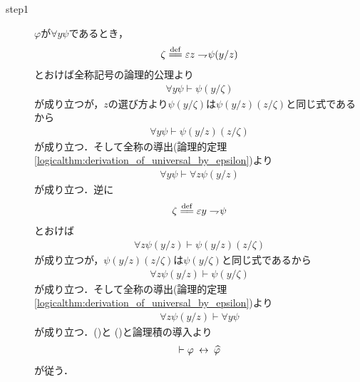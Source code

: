 	\begin{sketch}\mbox{}
		\begin{description}
			\item[step1]
				$\varphi$が$\forall y \psi$であるとき，
				\begin{align}
					\zeta \defeq \varepsilon z \negation \psi(y/z)
				\end{align}
				とおけば全称記号の論理的公理より
				\begin{align}
					\forall y \psi \vdash \psi(y/\zeta)
				\end{align}
				が成り立つが，$z$の選び方より$\psi(y/\zeta)$は$\psi(y/z)(z/\zeta)$と同じ式であるから
				\begin{align}
					\forall y \psi \vdash \psi(y/z)(z/\zeta)
				\end{align}
				が成り立つ．そして全称の導出(論理的定理\ref{logicalthm:derivation_of_universal_by_epsilon})より
				\begin{align}
					\forall y \psi \vdash \forall z \psi(y/z)
					\label{fom:equivalence_by_replacing_bound_variables_1}
				\end{align}
				が成り立つ．逆に
				\begin{align}
					\zeta \defeq \varepsilon y \negation \psi
				\end{align}
				とおけば
				\begin{align}
					\forall z \psi(y/z) \vdash \psi(y/z)(z/\zeta)
				\end{align}
				が成り立つが，$\psi(y/z)(z/\zeta)$は$\psi(y/\zeta)$と同じ式であるから
				\begin{align}
					\forall z \psi(y/z) \vdash \psi(y/\zeta)
				\end{align}
				が成り立つ．そして全称の導出(論理的定理\ref{logicalthm:derivation_of_universal_by_epsilon})より
				\begin{align}
					\forall z \psi(y/z) \vdash \forall y \psi
					\label{fom:equivalence_by_replacing_bound_variables_2}
				\end{align}
				が成り立つ．()と
				()と論理積の導入より
				\begin{align}
					\vdash \varphi \hspace{0.25em}\leftrightarrow\hspace{0.25em} \widehat{\varphi}
				\end{align}
				が従う．
				

\end{description}
\end{sketch}
